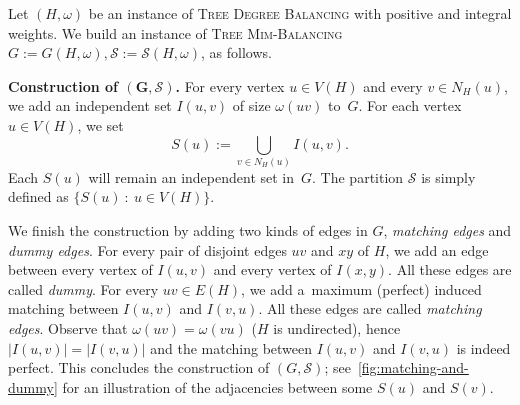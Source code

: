 \documentclass[a4paper,UKenglish,cleveref,hyperref,autoref]{lipics-v2021}
\newcommand{\weight}{\omega}
\newcommand{\tdb}{\textsc{Tree Degree Balancing}\xspace}
\newcommand{\tmb}{\textsc{Tree Mim-Balancing}\xspace}
\begin{document}
Let $(H, \weight)$ be an instance of \tdb with positive and integral weights.
We build an instance of \tmb $G := G(H, \weight), \mathcal S := \mathcal{S}(H, \weight)$, as follows.

\medskip

\textbf{Construction of $\bm{(G,\mathcal S)}$.}
For every vertex $u \in V(H)$ and every $v \in N_H(u)$, we add an independent set $I(u, v)$ of size $\weight(uv)$ to~$G$.
For each vertex $u \in V(H)$, we set~$$S(u) := \bigcup_{v \in N_H(u)} I(u, v).$$
Each $S(u)$ will remain an independent set in~$G$.
The partition $\mathcal S$ is simply defined as $\{S(u)~:~u \in V(H)\}$.

We finish the construction by adding two kinds of edges in $G$, \emph{matching edges} and \emph{dummy edges}. 
For every pair of disjoint edges $uv$ and $xy$ of $H$, we add an edge between every vertex of $I(u, v)$ and every vertex of $I(x, y)$.
%
All these edges are called \emph{dummy}.
For every $uv \in E(H)$, we add a~maximum (perfect) induced matching between $I(u,v)$ and $I(v,u)$.
All these edges are called \emph{matching edges}.
Observe that $\weight(uv)=\weight(vu)$ ($H$ is undirected), hence $|I(u,v)|=|I(v,u)|$ and the matching between $I(u,v)$ and $I(v,u)$ is indeed perfect.  
This concludes the construction of $(G, \mathcal S)$; see~\cref{fig:matching-and-dummy} for an illustration of the adjacencies between some $S(u)$ and $S(v)$.
\end{document}
